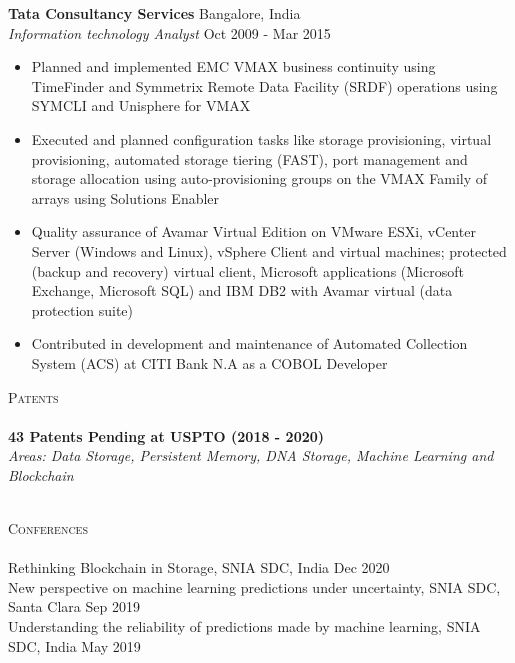 \documentclass[a4paper]{article}
\newcommand{\lineunder} {
    \vspace*{-8pt} \\
    \hspace*{-18pt} \hrulefill \\
}
\newcommand{\header} [1] {
    {\hspace*{-18pt}\vspace*{6pt} \textsc{#1}}
    \vspace*{-6pt} \lineunder
}
\begin{document}
\vspace{2mm}
\textbf{Tata Consultancy Services} \hfill Bangalore, India\\
\textit{Information technology Analyst} \hfill Oct 2009 - Mar 2015\\
\vspace{-1mm}
\justify
\begin{itemize} \itemsep 1pt
	\item Planned and implemented EMC VMAX business continuity using TimeFinder and Symmetrix Remote Data Facility (SRDF) operations using SYMCLI and Unisphere for VMAX
	\item Executed and planned configuration tasks like storage provisioning, virtual provisioning, automated storage tiering (FAST), port management and storage allocation using auto-provisioning groups on the VMAX Family of arrays using Solutions Enabler
	\item Quality assurance of Avamar Virtual Edition on VMware ESXi, vCenter Server (Windows and Linux), vSphere Client and virtual machines; protected (backup and recovery) virtual client, Microsoft applications (Microsoft Exchange, Microsoft SQL) and IBM DB2 with Avamar virtual (data protection suite)
	\item Contributed in development and maintenance of Automated Collection System (ACS) at CITI Bank N.A as a COBOL Developer
\end{itemize}




{\color{blue}\header{Patents}}
{\textbf{43 Patents Pending at USPTO (2018 - 2020)}}\\
\textit{Areas: Data Storage, Persistent Memory, DNA Storage, Machine Learning and Blockchain} \\
{} \\

\vspace*{2mm}


{\color{blue}\header{Conferences}}
Rethinking Blockchain in Storage, SNIA SDC, India \hfill Dec 2020\\
\vspace*{1mm}
New perspective on machine learning predictions under uncertainty, SNIA SDC, Santa Clara \hfill Sep 2019\\
\vspace*{1mm}
Understanding the reliability of predictions made by machine learning, SNIA SDC, India \hfill May 2019\\
\vspace*{1mm}
\end{document}
